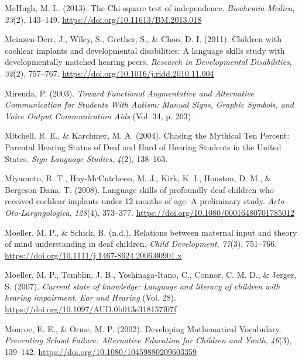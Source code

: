 \documentclass[
  english,
  man]{apa6}
\begin{document}
\leavevmode\hypertarget{ref-mchugh2013}{}%
McHugh, M. L. (2013). The Chi-square test of independence. \emph{Biochemia Medica}, \emph{23}(2), 143--149. \url{https://doi.org/10.11613/BM.2013.018}

\leavevmode\hypertarget{ref-meinzen-derr2011}{}%
Meinzen-Derr, J., Wiley, S., Grether, S., \& Choo, D. I. (2011). Children with cochlear implants and developmental disabilities: A language skills study with developmentally matched hearing peers. \emph{Research in Developmental Disabilities}, \emph{32}(2), 757--767. \url{https://doi.org/10.1016/j.ridd.2010.11.004}

\leavevmode\hypertarget{ref-mirenda2003}{}%
Mirenda, P. (2003). \emph{Toward Functional Augmentative and Alternative Communication for Students With Autism: Manual Signs, Graphic Symbols, and Voice Output Communication Aids} (Vol. 34, p. 203).

\leavevmode\hypertarget{ref-mitchell2004}{}%
Mitchell, R. E., \& Karchmer, M. A. (2004). Chasing the Mythical Ten Percent: Parental Hearing Status of Deaf and Hard of Hearing Students in the United States. \emph{Sign Language Studies}, \emph{4}(2), 138--163.

\leavevmode\hypertarget{ref-miyamoto2008}{}%
Miyamoto, R. T., Hay-McCutcheon, M. J., Kirk, K. I., Houston, D. M., \& Bergeson-Dana, T. (2008). Language skills of profoundly deaf children who received cochlear implants under 12 months of age: A preliminary study. \emph{Acta Oto-Laryngologica}, \emph{128}(4), 373--377. \url{https://doi.org/10.1080/00016480701785012}

\leavevmode\hypertarget{ref-moeller2006}{}%
Moeller, M. P., \& Schick, B. (n.d.). Relations between maternal input and theory of mind understanding in deaf children. \emph{Child Development}, \emph{77}(3), 751--766. \url{https://doi.org/10.1111/j.1467-8624.2006.00901.x}

\leavevmode\hypertarget{ref-moeller2007}{}%
Moeller, M. P., Tomblin, J. B., Yoshinaga-Itano, C., Connor, C. M. D., \& Jerger, S. (2007). \emph{Current state of knowledge: Language and literacy of children with hearing impairment}. \emph{Ear and Hearing} (Vol. 28). \url{https://doi.org/10.1097/AUD.0b013e318157f07f}

\leavevmode\hypertarget{ref-monroe2002}{}%
Monroe, E. E., \& Orme, M. P. (2002). Developing Mathematical Vocabulary. \emph{Preventing School Failure: Alternative Education for Children and Youth}, \emph{46}(3), 139--142. \url{https://doi.org/10.1080/10459880209603359}
\end{document}

